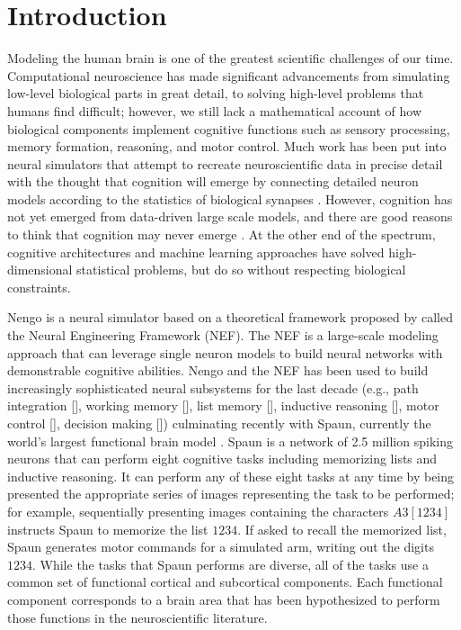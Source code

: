 \documentclass{frontiersSCNS}
\begin{document}

\section{Introduction}

Modeling the human brain
is one of the greatest
scientific challenges of our time.
Computational neuroscience
has made significant advancements
from simulating low-level biological parts in great detail,
to solving high-level problems that humans find difficult;
however, we still lack a mathematical account of
how biological components
implement cognitive functions such as sensory processing,
memory formation, reasoning, and motor control.
Much work has been put into neural simulators
that attempt to recreate neuroscientific
data in precise detail with the thought that
cognition will emerge by connecting
detailed neuron models according
to the statistics of biological synapses \citep{markram2006}.
However, cognition has not yet emerged
from data-driven large scale models,
and there are good reasons to think
that cognition may never emerge \citep{trujillo-inpress}.
At the other end of the spectrum,
cognitive architectures \citep{anderson2004}
and machine learning approaches \citep{hinton2006}
have solved high-dimensional statistical problems,
but do so without respecting biological constraints.

Nengo is a neural simulator
based on a theoretical framework proposed
by \citet{eliasmith2003}
called the Neural Engineering Framework
(NEF).
The NEF is a large-scale modeling approach
that can leverage single neuron models
to build neural networks with
demonstrable cognitive abilities.
Nengo and the NEF has been used to build
increasingly sophisticated neural subsystems
for the last decade
(e.g., path integration [\citealp{conklin2005}],
working memory [\citealp{singh2006}],
list memory [\citealp{choo2010}],
inductive reasoning [\citealp{rasmussen2011}],
motor control [\citealp{dewolf2011}],
decision making [\citealp{stewart2012}])
culminating recently with Spaun,
currently the world's
largest functional brain model \citep{eliasmith2012}.
Spaun is a network of 2.5 million spiking neurons
that can perform eight cognitive tasks
including memorizing lists and inductive reasoning.
It can perform any of these eight tasks
at any time by being presented
the appropriate series of images
representing the task to be performed;
for example, sequentially presenting images
containing the characters $A3[1234]$ instructs Spaun
to memorize the list $1234$.
If asked to recall the memorized list,
Spaun generates motor commands for a simulated arm,
writing out the digits $1234$.
While the tasks that Spaun performs are diverse,
all of the tasks use a common set of
functional cortical and subcortical components.
Each functional component corresponds
to a brain area that has been hypothesized
to perform those functions
in the neuroscientific literature.
\end{document}
